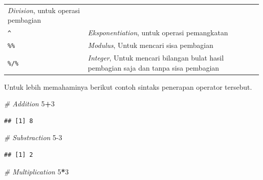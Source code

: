 \documentclass[12pt,]{krantz}
\newenvironment{Shaded}{\begin{snugshade}}{\end{snugshade}}
\newcommand{\CommentTok}[1]{\textcolor[rgb]{0.56,0.35,0.01}{\textit{#1}}}
\newcommand{\DecValTok}[1]{\textcolor[rgb]{0.00,0.00,0.81}{#1}}
\newcommand{\OperatorTok}[1]{\textcolor[rgb]{0.81,0.36,0.00}{\textbf{#1}}}
\begin{document}
\begin{longtable}[]{@{}ll@{}}
\begin{minipage}[t]{0.80\columnwidth}
\emph{Division}, untuk operasi pembagian\strut
\end{minipage}\tabularnewline
\begin{minipage}[t]{0.14\columnwidth}\raggedright
\texttt{\^{}}\strut
\end{minipage} & \begin{minipage}[t]{0.80\columnwidth}\raggedright
\emph{Eksponentiation}, untuk operasi pemangkatan\strut
\end{minipage}\tabularnewline
\begin{minipage}[t]{0.14\columnwidth}\raggedright
\texttt{\%\%}\strut
\end{minipage} & \begin{minipage}[t]{0.80\columnwidth}\raggedright
\emph{Modulus}, Untuk mencari sisa pembagian\strut
\end{minipage}\tabularnewline
\begin{minipage}[t]{0.14\columnwidth}\raggedright
\texttt{\%/\%}\strut
\end{minipage} & \begin{minipage}[t]{0.80\columnwidth}\raggedright
\emph{Integer}, Untuk mencari bilangan bulat hasil pembagian saja dan tanpa sisa pembagian\strut
\end{minipage}\tabularnewline
\bottomrule
\end{longtable}

Untuk lebih memahaminya berikut contoh sintaks penerapan operator tersebut.

\begin{Shaded}
\begin{Highlighting}[]
\CommentTok{# Addition}
\DecValTok{5}\OperatorTok{+}\DecValTok{3}
\end{Highlighting}
\end{Shaded}

\begin{verbatim}
## [1] 8
\end{verbatim}

\begin{Shaded}
\begin{Highlighting}[]
\CommentTok{# Substraction}
\DecValTok{5-3}
\end{Highlighting}
\end{Shaded}

\begin{verbatim}
## [1] 2
\end{verbatim}

\begin{Shaded}
\begin{Highlighting}[]
\CommentTok{# Multiplication}
\DecValTok{5}\OperatorTok{*}\DecValTok{3}
\end{Highlighting}
\end{Shaded}
\end{document}
